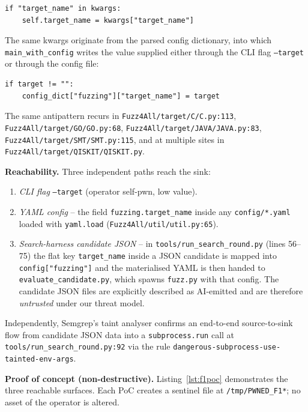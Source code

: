 \documentclass[conference]{IEEEtran}
\begin{document}
\begin{lstlisting}[style=py,caption={Target.\_\_init\_\_ attribute assignment in Fuzz4All/target/target.py.},firstnumber=171]
if "target_name" in kwargs:
    self.target_name = kwargs["target_name"]
\end{lstlisting}

The same kwargs originate from the parsed config dictionary, into which
\texttt{main\_with\_config} writes the value supplied either through the
CLI flag \texttt{--target} or through the config file:

\begin{lstlisting}[style=py,caption={Source assignment in Fuzz4All/fuzz.py.},firstnumber=443]
if target != "":
    config_dict["fuzzing"]["target_name"] = target
\end{lstlisting}

The same antipattern recurs in
\texttt{Fuzz4All/target/C/C.py:113}, \texttt{Fuzz4All/target/GO/GO.py:68},
\texttt{Fuzz4All/target/JAVA/JAVA.py:83},
\texttt{Fuzz4All/target/SMT/SMT.py:115}, and at multiple sites in
\texttt{Fuzz4All/target/QISKIT/QISKIT.py}.

\textbf{Reachability.} Three independent paths reach the sink:
\begin{enumerate}[label=(\roman*),leftmargin=*]
\item \emph{CLI flag} \texttt{--target} (operator self-pwn, low value).
\item \emph{YAML config} -- the field
\verb|fuzzing.target_name| inside any \texttt{config/*.yaml} loaded with
\texttt{yaml.load} (\texttt{Fuzz4All/util/util.py:65}).
\item \emph{Search-harness candidate JSON} -- in
\texttt{tools/run\_search\_round.py} (lines 56--75) the flat key
\verb|target_name| inside a JSON candidate is mapped into
\verb|config["fuzzing"]| and the materialised YAML is then handed to
\texttt{evaluate\_candidate.py}, which spawns \texttt{fuzz.py} with that
config. The candidate JSON files are explicitly described as AI-emitted
and are therefore \emph{untrusted} under our threat model.
\end{enumerate}
Independently, Semgrep's taint analyser confirms an end-to-end source-to-sink
flow from candidate JSON data into a \texttt{subprocess.run} call at
\texttt{tools/run\_search\_round.py:92} via the rule
\verb|dangerous-subprocess-use-tainted-env-args|.

\textbf{Proof of concept (non-destructive).} Listing~\ref{lst:f1poc}
demonstrates the three reachable surfaces. Each PoC creates a sentinel
file at \texttt{/tmp/PWNED\_F1*}; no asset of the operator is altered.
\end{document}
